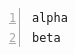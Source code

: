 \documentclass{article}
\begin{document}
\begin{Verbatim}[fontsize=\small,numbers=left]
alpha
beta
\end{Verbatim}
\end{document}
